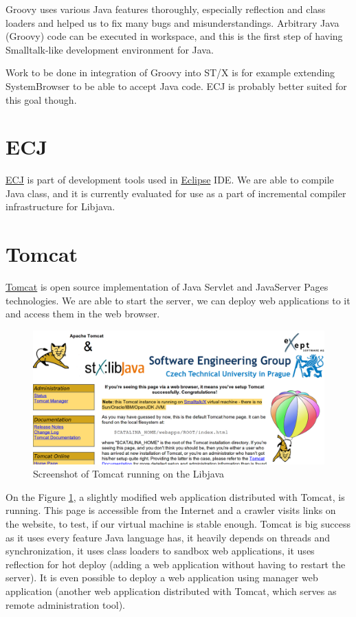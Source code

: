 \documentclass[11pt,twoside,a4paper]{book}
\newcommand{\libjava}{{Libjava}}
\begin{document}
Groovy uses various Java features thoroughly, especially reflection and class loaders and helped us to fix many bugs and misunderstandings. 
Arbitrary Java (Groovy) code can be executed in workspace, and this is the first step of having Smalltalk-like development environment for Java.

Work to be done in integration of Groovy into ST/X is for example extending SystemBrowser to be able to accept Java code.
ECJ is probably better suited for this goal though.

\section{ECJ}

\href{http://eclipse.org/jdt/}{ECJ} is part of development tools used in \href{www.eclipse.org}{Eclipse} IDE.
We are able to compile Java class, and it is currently evaluated for use as a part of incremental compiler infrastructure for \libjava{}.

\section{Tomcat}

\href{http://tomcat.apache.org/}{Tomcat} is open source implementation of Java Servlet and JavaServer Pages technologies.
We are able to start the server, we can deploy web applications to it and access them in the web browser.

\begin{figure}[h]
	\begin{center}
		\includegraphics[width=15cm]{figures/tomcat.png}
	\end{center}
	\caption{Screenshot of Tomcat running on the \libjava{}}
	\label{fig:tomcat}
\end{figure}

On the Figure \ref{fig:tomcat}, a slightly modified web application distributed with Tomcat, is running.
This page is accessible from the Internet and a crawler visits links on the website, to test, if our virtual machine is stable enough.
Tomcat is big success as it uses every feature Java language has, it heavily depends on threads and synchronization, it uses class loaders to sandbox web applications, it uses reflection for hot deploy (adding a web application without having to restart the server).
It is even possible to deploy a web application using manager web application (another web application distributed with Tomcat, which serves as remote administration tool).
\end{document}
